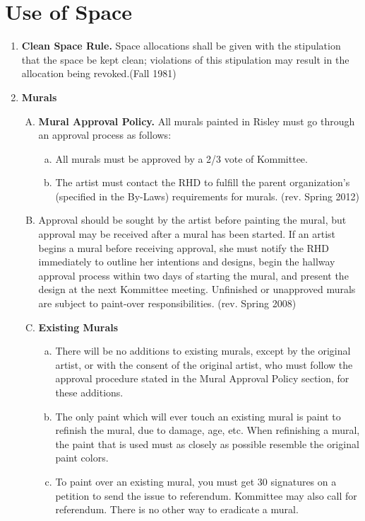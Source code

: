 \documentclass[12pt]{article}
\begin{document}
\section*{Use of Space}
\begin{enumerate}[1.]
\item \textbf{Clean Space Rule.} Space allocations shall be given with the stipulation that the space be kept clean; violations of this stipulation may result in the allocation being revoked.(Fall 1981)
\item \textbf{Murals}
\begin{enumerate}[A.] 
\item \textbf{Mural Approval Policy.} All murals painted in Risley must go through an approval process as follows:
\begin{enumerate}[a.]
\item All murals must be approved by a 2/3 vote of Kommittee.
\item The artist must contact the RHD to fulfill the parent organization's (specified in the By-Laws) requirements for murals. (rev. Spring 2012) 
\end{enumerate}
\item Approval should be sought by the artist before painting the mural, but approval may be received after a mural has been started. If an artist begins a mural before receiving approval, she must notify the RHD immediately to outline her intentions and designs, begin the hallway approval process within two days of starting the mural, and present the design at the next Kommittee meeting. Unfinished or unapproved murals are subject to paint-over responsibilities. (rev. Spring 2008) 
\item \textbf{Existing Murals}
\begin{enumerate}[a.]
\item There will be no additions to existing murals, except by the original artist, or with the consent of the original artist, who must follow the approval procedure stated in the Mural Approval Policy section, for these additions.
\item The only paint which will ever touch an existing mural is paint to refinish the mural, due to damage, age, etc. When refinishing a mural, the paint that is used must as closely as possible resemble the original paint colors.
\item To paint over an existing mural, you must get 30 signatures on a petition to send the issue to referendum. Kommittee may also call for referendum. There is no other way to eradicate a mural. 

\end{enumerate}
\end{enumerate}
\end{enumerate}
\end{document}
